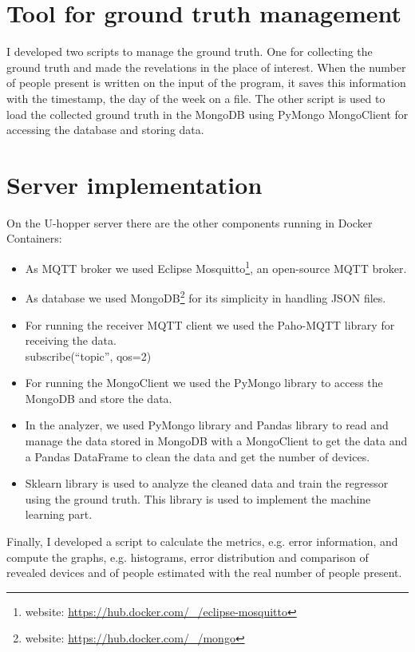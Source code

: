 


\section{Tool for ground truth management}
\label{sec:toolgt}
\vspace{0.2 cm} 

I developed two scripts to manage the ground truth. One for collecting the ground truth and made the revelations in the place of interest. When the number of people present is written on the input of the program, it saves this information with the timestamp, the day of the week on a file.
The other script is used to load the collected ground truth in the MongoDB using PyMongo MongoClient for accessing the database and storing data.


\section{Server implementation}
\label{sec:server}
\vspace{0.2 cm} 

On the U-hopper server there are the other components running in Docker Containers:
\begin{itemize}
  \item As MQTT broker we used Eclipse Mosquitto\footnote{ website: \url{https://hub.docker.com/_/eclipse-mosquitto} }, an open-source MQTT broker.
  \item As database we used MongoDB\footnote{ website: \url{https://hub.docker.com/_/mongo} } for its simplicity in handling JSON files.
  \item For running the receiver MQTT client we used the Paho-MQTT library for receiving the data.\\subscribe(``topic'', qos=2)
  \item For running the MongoClient we used the PyMongo library to access the MongoDB and store the data.
  \item In the analyzer, we used PyMongo library and Pandas library to read and manage the data stored in MongoDB with a MongoClient to get the data and a Pandas DataFrame to clean the data and get the number of devices.
  \item Sklearn library is used to analyze the cleaned data and train the regressor using the ground truth. This library is used to implement the machine learning part.
\end{itemize}

Finally, I developed a script to calculate the metrics, e.g. error information, and compute the graphs, e.g. histograms, error distribution and comparison of revealed devices and of people estimated with the real number of people present.
